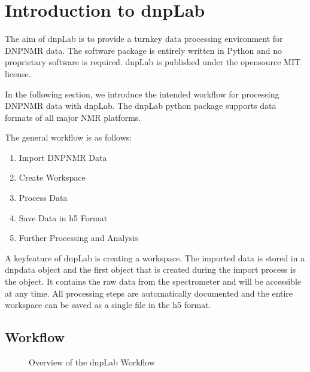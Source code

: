 \documentclass[letterpaper,10pt,english]{sphinxmanual}
\let\sphinxpxdimen\pdfpxdimen\else\newdimen\sphinxpxdimen
\begin{document}
\section{Introduction to dnpLab}
\label{\detokenize{introduction:introduction-to-dnplab}}\label{\detokenize{introduction::doc}}
The aim of dnpLab is to provide a turn\sphinxhyphen{}key data processing environment for DNP\sphinxhyphen{}NMR data. The software package is entirely written in Python and no proprietary software is required. dnpLab is published under the open\sphinxhyphen{}source MIT license.

In the following section, we introduce the intended workflow for processing DNP\sphinxhyphen{}NMR data with dnpLab. The dnpLab python package supports data formats of all major NMR platforms.

The general workflow is as follows:
\begin{enumerate}
%
\item {} 
Import DNP\sphinxhyphen{}NMR Data

\item {} 
Create Workspace

\item {} 
Process Data

\item {} 
Save Data in h5 Format

\item {} 
Further Processing and Analysis

\end{enumerate}

A key\sphinxhyphen{}feature of dnpLab is creating a workspace. The imported data is stored in a dnpdata object and the first object that is created during the import process is the  object. It contains the raw data from the spectrometer and will be accessible at any time. All processing steps are automatically documented and the entire workspace can be saved as a single file in the h5 format.


\subsection{Workflow}
\label{\detokenize{introduction:workflow}}
\begin{figure}[htbp]
\centering
\capstart

\noindent\sphinxincludegraphics[width=400\sphinxpxdimen]{{dnpLab_workflow}.png}
\caption{Overview of the dnpLab Workflow}\label{\detokenize{introduction:id1}}\end{figure}
\end{document}
